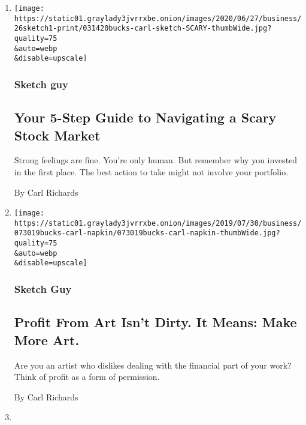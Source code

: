 \begin{enumerate}
\def\labelenumi{\arabic{enumi}.}
\item
  \href{/2020/06/26/business/investing-stock-market-fear.html}{}

  \texttt{[image: https://static01.graylady3jvrrxbe.onion/images/2020/06/27/business/26sketch1-print/031420bucks-carl-sketch-SCARY-thumbWide.jpg?quality=75\\\&auto=webp\\\&disable=upscale]}

  \hypertarget{sketch-guy}{%
  \subsubsection{Sketch guy}\label{sketch-guy}}

  \hypertarget{your-5-step-guide-to-navigating-a-scary-stock-market}{%
  \subsection{Your 5-Step Guide to Navigating a Scary Stock
  Market}\label{your-5-step-guide-to-navigating-a-scary-stock-market}}

  Strong feelings are fine. You're only human. But remember why you
  invested in the first place. The best action to take might not involve
  your portfolio.

  By Carl Richards
\item
  \href{/2019/10/25/your-money/profit-art-business.html}{}

  \texttt{[image: https://static01.graylady3jvrrxbe.onion/images/2019/07/30/business/073019bucks-carl-napkin/073019bucks-carl-napkin-thumbWide.jpg?quality=75\\\&auto=webp\\\&disable=upscale]}

  \hypertarget{sketch-guy-1}{%
  \subsubsection{Sketch Guy}\label{sketch-guy-1}}

  \hypertarget{profit-from-art-isnt-dirty-it-means-make-more-art}{%
  \subsection{Profit From Art Isn't Dirty. It Means: Make More
  Art.}\label{profit-from-art-isnt-dirty-it-means-make-more-art}}

  Are you an artist who dislikes dealing with the financial part of your
  work? Think of profit as a form of permission.

  By Carl Richards
\item
  \href{/2019/09/12/your-money/how-to-do-better-than-merely-getting-ahead.html}{}


\end{enumerate}
